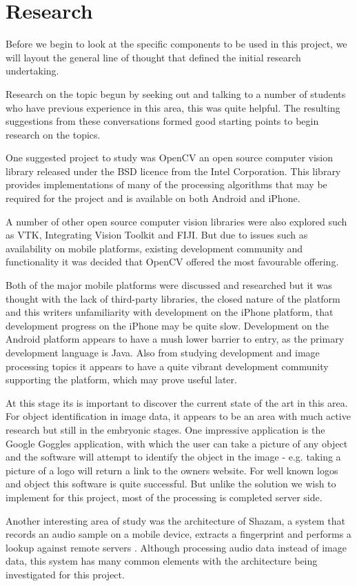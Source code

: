 \chapter{Research}

Before we begin to look at the specific components to be used in this project, we will layout the general line of thought that defined the initial research undertaking.

Research on the topic begun by seeking out and talking to a number of students who have previous experience in this area, this was quite helpful. The resulting suggestions from these conversations formed good starting points to begin research on the topics.

One suggested project to study was OpenCV an open source computer vision library released under the BSD licence from the Intel Corporation\textsuperscript{\texttrademark}. This library provides implementations of many of the processing algorithms that may be required for the project and is available on both Android and iPhone.

A number of other open source computer vision libraries were also explored such as VTK, Integrating Vision Toolkit and FIJI. But due to issues such as availability on mobile platforms, existing development community and functionality it was decided that OpenCV offered the most favourable offering.

Both of the major mobile platforms were discussed and researched but it was thought with the lack of third-party libraries, the closed nature of the platform and this writers unfamiliarity with development on the iPhone platform, that development progress on the iPhone may be quite slow. Development on the Android platform appears to have a mush lower barrier to entry, as the primary development language is Java. Also from studying development and image processing topics it appears to have a quite vibrant development community supporting the platform, which may prove useful later.

At this stage its is important to discover the current state of the art in this area. For object identification in image data, it appears to be an area with much active research but still in the embryonic stages. One impressive application is the Google Goggles application, with which the user can take a picture of any object and the software will attempt to identify the object in the image - e.g. taking a picture of a logo will return a link to the owners website. For well known logos and object this software is quite successful. But unlike the solution we wish to implement for this project, most of the processing is completed server side.

Another interesting area of study was the architecture of Shazam, a system that records an audio sample on a mobile device, extracts a fingerprint and performs a lookup against remote servers \cite{laplacian09, redcode10}. Although processing audio data instead of image data, this system has many common elements with the architecture being investigated for this project.
